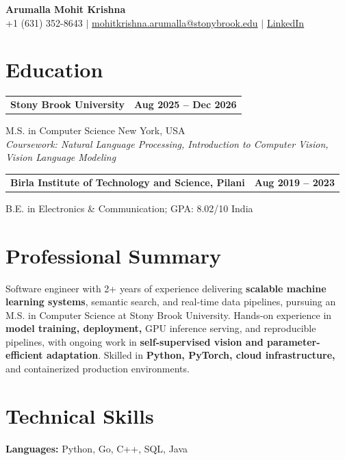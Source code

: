 \documentclass[letterpaper,10pt]{article}
\makeatletter
\newcommand{\entry}[2]{%
  \noindent
  \begin{tabularx}{\linewidth}
    {@{}>{\raggedright\arraybackslash}X@{\hspace{6pt}}r@{}}
    \textbf{#1} & #2
  \end{tabularx}\par
}
\makeatother
\begin{document}
\begin{center}
    {\LARGE\bfseries Arumalla Mohit Krishna}\\[3pt]
    +1 (631) 352-8643 $|$
    \href{mailto:mohitkrishna.arumalla@stonybrook.edu}
    {mohitkrishna.arumalla@stonybrook.edu} $|$
    \href{https://linkedin.com/in/mohit-krishna-arumalla}
    {LinkedIn}
\end{center}
\vspace{-8pt}

\section{Education}

\entry
  {Stony Brook University}
  {\textbf{Aug 2025 -- Dec 2026}}

M.S. in Computer Science \hfill New York, USA\\
\textit{
Coursework: Natural Language Processing,
Introduction to Computer Vision, Vision Language Modeling
}
\vspace{3pt}

\entry
  {Birla Institute of Technology and Science, Pilani}
  {\textbf{Aug 2019 -- 2023}}

B.E. in Electronics \& Communication; GPA: 8.02/10 \hfill India
\section{Professional Summary}

Software engineer with 2+ years of experience delivering \textbf{scalable machine learning systems}, semantic search, and real-time data pipelines, pursuing an M.S. in Computer Science at Stony Brook University. Hands-on experience in \textbf{model training, deployment,} GPU inference serving, and reproducible pipelines, with ongoing work in \textbf{self-supervised vision and parameter-efficient adaptation}. Skilled in \textbf{Python, PyTorch, cloud infrastructure,} and containerized production environments.

\section{Technical Skills}

\textbf{Languages:}
Python, Go, C++, SQL, Java\\
\end{document}
